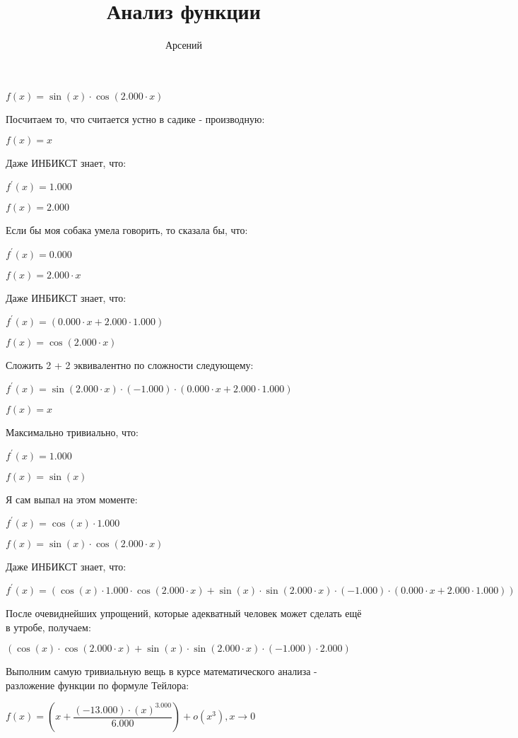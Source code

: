 \documentclass[a4paper,12pt]{article}
\author{\LARGEМерзляков Арсений}
\title{Анализ функции}
\begin{document}
\maketitle
\begin{flushleft}
\Large
$f(x) = \sin {(x)} \cdot \cos {(2.000 \cdot x)}$

Посчитаем то, что считается устно в садике - производную:

$f(x) = x$

Даже ИНБИКСТ знает, что:

$f^{'}(x) = 1.000$

$f(x) = 2.000$

Если бы моя собака умела говорить, то сказала бы, что:

$f^{'}(x) = 0.000$

$f(x) = 2.000 \cdot x$

Даже ИНБИКСТ знает, что:

$f^{'}(x) = (0.000 \cdot x+2.000 \cdot 1.000)$

$f(x) = \cos {(2.000 \cdot x)}$

Сложить 2 + 2 эквивалентно по сложности следующему:

$f^{'}(x) = \sin {(2.000 \cdot x)} \cdot (-1.000) \cdot (0.000 \cdot x+2.000 \cdot 1.000)$

$f(x) = x$

Максимально тривиально, что:

$f^{'}(x) = 1.000$

$f(x) = \sin {(x)}$

Я сам выпал на этом моменте:

$f^{'}(x) = \cos {(x)} \cdot 1.000$

$f(x) = \sin {(x)} \cdot \cos {(2.000 \cdot x)}$

Даже ИНБИКСТ знает, что:

$f^{'}(x) = (\cos {(x)} \cdot 1.000 \cdot \cos {(2.000 \cdot x)}+\sin {(x)} \cdot \sin {(2.000 \cdot x)} \cdot (-1.000) \cdot (0.000 \cdot x+2.000 \cdot 1.000))$

После очевиднейших упрощений, которые адекватный человек может сделать ещё в утробе, получаем:

$(\cos {(x)} \cdot \cos {(2.000 \cdot x)}+\sin {(x)} \cdot \sin {(2.000 \cdot x)} \cdot (-1.000) \cdot 2.000)$

Выполним самую тривиальную вещь в курсе математического анализа - разложение функции по формуле Тейлора: 

$f(x) = (x+ \dfrac{(-13.000) \cdot (x)^{3.000}}{6.000} ) + o(x^{3}), x \rightarrow 0$

\end{flushleft}
\end{document}
